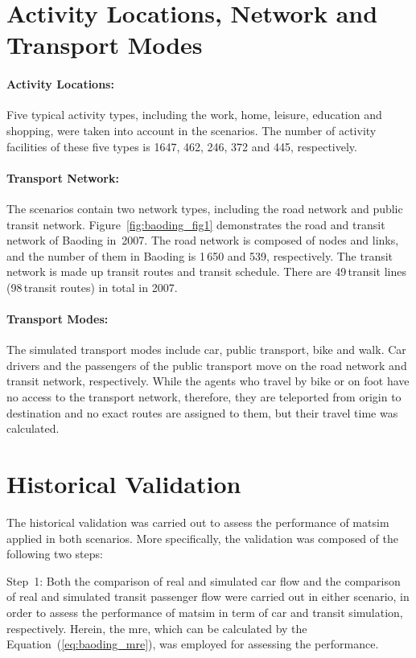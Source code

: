 \section{Activity Locations, Network and Transport Modes}
\paragraph{Activity Locations:} Five typical activity types, including the work, home, leisure, education and shopping, were taken into account in the scenarios. 
The number of activity facilities of these five types is 1647, 462, 246, 372 and 445, respectively. 

\paragraph{Transport Network:} The scenarios contain two network types, including the road network and public transit network. 
Figure~\ref{fig:baoding_fig1} demonstrates the road and transit network of Baoding in~2007. The road network is composed of nodes and links, and the number of them in Baoding is 1\,650 and 539, respectively. 
The transit network is made up transit routes and transit schedule. There are 49\,transit lines (98\,transit routes) in total in 2007. 

\paragraph{Transport Modes:} The simulated transport modes include car, public transport, bike and walk. Car drivers and the passengers of the public transport move on the road network and transit network, respectively. While the agents who travel by bike or on foot have no access to the transport network, therefore, they are \gls{teleported} from origin to destination and no exact routes are assigned to them, but their travel time was calculated. 

\section{Historical Validation}
The historical validation was carried out to assess the performance of \gls{matsim} applied in both scenarios. 
More specifically, the validation was composed of the following two steps:

Step~1: Both the comparison of real and simulated car flow and the comparison of real and simulated transit passenger flow were carried out in either scenario, in order to assess the performance of \gls{matsim} in term of car and transit simulation, respectively. 
Herein, the \gls{mre}, which can be calculated by the Equation~(\ref{eq:baoding_mre}), was employed for assessing the performance.

